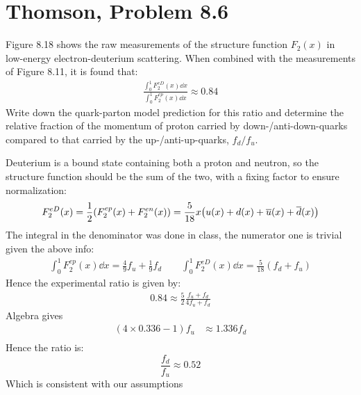 \documentclass[12pt]{article}
\renewcommand{\bar}{\overline}
\begin{document}
\section{Thomson, Problem 8.6}
\begin{problem}
  Figure 8.18 shows the raw measurements of the structure function $F_2(x)$ in low-energy electron-deuterium scattering. When combined with the measurements of Figure 8.11, it is found that:
  \begin{align*}
    \frac{\int_0^1F^{eD}_2(x)\dd{x}}{\int_0^1F^{ep}_2(x)\dd{x}}\approx0.84
  \end{align*}
  Write down the quark-parton model prediction for this ratio and determine the relative fraction of the momentum of proton carried by down-/anti-down-quarks compared to that carried by the up-/anti-up-quarks, $f_d/f_u$.
\end{problem}
Deuterium is a bound state containing both a proton and neutron, so the structure function should be the sum of the two, with a fixing factor to ensure normalization:
\begin{align*}
  F^{eD}_2(x)=\frac12(F_2^{ep}(x)+F_2^{en}(x))=\frac5{18}x\qty(u(x)+d(x)
  +\bar{u}(x)+\bar{d}(x))
\end{align*}
The integral in the denominator was done in class, the numerator one is trivial given the above info:
\begin{align*}
  \int_0^1F_2^{ep}(x)\dd{x}=\frac49f_u+\frac19f_d\qquad
  \int_0^1F_2^{eD}(x)\dd{x}=\frac5{18}(f_d+f_u)
\end{align*}
Hence the experimental ratio is given by:
\begin{align*}
  0.84\approx\frac52\frac{f_u+f_d}{4f_u+f_d}
\end{align*}
Algebra gives
\begin{align*}
  (4\times 0.336-1)f_u&\approx 1.336f_d\\
\end{align*}
Hence the ratio is:
\begin{equation}
  \label{eq:p5}
  \boxed{\frac{f_d}{f_u}\approx0.52}
\end{equation}
Which is consistent with our assumptions
\newpage
\end{document}
